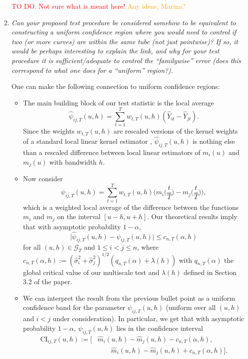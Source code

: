 \documentclass[a4paper,12pt]{article}
\begin{document}
\begin{enumerate}[label=\arabic*.,leftmargin=0.6cm]
\textcolor{red}{TO DO. Not sure what is meant here!} \textcolor{orange}{Any ideas, Marina?}


\item \textit{Can your proposed test procedure be considered somehow to be equivalent to constructing a uniform confidence region where you would need to control if two (or more curves) are within the same tube (not just pointwise)? If so, it would be perhaps interesting to explain the link, and why for your test procedure it is sufficient/adequate to control the ``familywise'' error (does this correspond to what one does for a ``uniform'' region?).}

One can make the following connection to uniform confidence regions: 
\begin{itemize}[leftmargin=0.45cm,itemsep=0pt,topsep=0pt]

\item The main building block of our test statistic is the local average
\[ \widehat{\psi}_{ij,T}(u,h) = \sum_{t=1}^T w_{t,T}(u,h) (\widehat{Y}_{it} - \widehat{Y}_{jt}). \]
Since the weights $w_{t,T}(u,h)$ are rescaled versions of the kernel weights of a standard local linear kernel estimator \citep{FanGijbels1996}, $\widehat{\psi}_{ij,T}(u,h)$ is nothing else than a rescaled difference between local linear estimators of $m_i(u)$ and $m_j(u)$ with bandwidth $h$. 

\item Now consider 
\[ \psi_{ij,T}(u,h) = \sum_{t=1}^T w_{t,T}(u,h) \Big(m_i\Big(\frac{t}{T}\Big) - m_j\Big(\frac{t}{T}\Big)\Big), \]
which is a weighted local average of the difference between the functions $m_i$ and $m_j$ on the interval $[u-h,u+h]$. Our theoretical results imply that with asymptotic probability $1-\alpha$, 
\[ \big| \widehat{\psi}_{ij,T}(u,h) - \psi_{ij,T}(u,h) \big| \le c_{n,T}(\alpha,h) \]
for all $(u,h) \in \mathcal{G}_T$ and $1 \le i < j \le n$, where $c_{n,T}(\alpha,h) := (\widehat{\sigma}_i^2 + \widehat{\sigma}_j^2)^{1/2} (q_{n,T}(\alpha) + \lambda(h))$ with $q_{n,T}(\alpha)$ the global critical value of our multiscale test and $\lambda(h)$ defined in Section 3.2 of the paper. 

\item We can interpret the result from the previous bullet point as a uniform confidence band for the parameter $\psi_{ij,T}(u,h)$ (uniform over all $(u,h)$ and $i < j$ under consideration). In particular, we get that with asymptotic probability $1-\alpha$, $\psi_{ij,T}(u,h)$ lies in the confidence interval
\begin{align*}
\text{CI}_{ij,T}(u,h) := \Big[ & \widehat{m}_{i}(u,h) - \widehat{m}_{j}(u,h) - c_{n,T}(\alpha,h), \\ & \qquad \widehat{m}_{i}(u,h) - \widehat{m}_{j}(u,h) + c_{n,T}(\alpha,h) \Big].
\end{align*}  


\end{itemize}
\end{enumerate}
\end{document}
